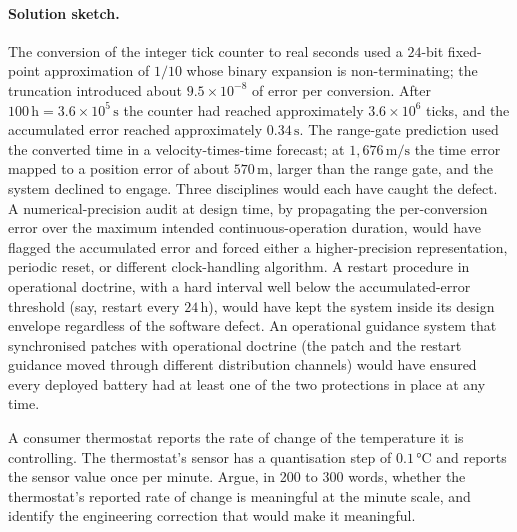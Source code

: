 \paragraph{Solution sketch.}
The conversion of the integer tick counter to real seconds used a
$24$-bit fixed-point approximation of $1/10$ whose binary
expansion is non-terminating; the truncation introduced about
$9.5 \times 10^{-8}$ of error per conversion. After
$100 \,\si{\hour} = 3.6 \times 10^{5} \,\si{\second}$ the counter
had reached approximately $3.6 \times 10^{6}$ ticks, and the
accumulated error reached approximately $0.34 \,\si{\second}$.
The range-gate prediction used the converted time in a
velocity-times-time forecast; at $1{,}676 \,\si{\meter\per
\second}$ the time error mapped to a position error of about
$570 \,\si{\meter}$, larger than the range gate, and the system
declined to engage. Three disciplines would each have caught the
defect. A numerical-precision audit at design time, by
propagating the per-conversion error over the maximum intended
continuous-operation duration, would have flagged the
accumulated error and forced either a higher-precision
representation, periodic reset, or different clock-handling
algorithm. A restart procedure in operational doctrine, with a
hard interval well below the accumulated-error threshold (say,
restart every $24 \,\si{\hour}$), would have kept the system
inside its design envelope regardless of the software defect. An
operational guidance system that synchronised patches with
operational doctrine (the patch and the restart guidance moved
through different distribution channels) would have ensured
every deployed battery had at least one of the two protections
in place at any time.

\begin{exercise}
A consumer thermostat reports the rate of change of the
temperature it is controlling. The thermostat's sensor has a
quantisation step of $0.1\,\si{\degreeCelsius}$ and reports the
sensor value once per minute. Argue, in 200 to 300 words,
whether the thermostat's reported rate of change is meaningful at
the minute scale, and identify the engineering correction that
would make it meaningful.
\end{exercise}

